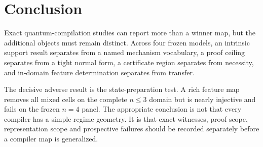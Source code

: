 \section{Conclusion}

Exact quantum-compilation studies can report more than a winner map, but the additional objects must remain distinct.  Across four frozen models, an intrinsic support result separates from a named mechanism vocabulary, a proof ceiling separates from a tight normal form, a certificate region separates from necessity, and in-domain feature determination separates from transfer.

The decisive adverse result is the state-preparation test.  A rich feature map removes all mixed cells on the complete $n\leq3$ domain but is nearly injective and fails on the frozen $n=4$ panel.  The appropriate conclusion is not that every compiler has a simple regime geometry.  It is that exact witnesses, proof scope, representation scope and prospective failures should be recorded separately before a compiler map is generalized.

